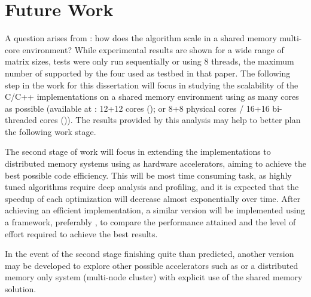 \section{Future Work}
A question arises from \cite{Deadman:Higham:Ralha:2012}: how does the algorithm scale in a shared memory multi-core environment? While experimental results are shown for a wide range of matrix sizes, tests were only run sequentially or using 8 threads, the maximum number of supported by the four \intel\xeon\cpus used as testbed in that paper. The following step in the work for this dissertation will focus in studying the scalability of the C/C++ implementations on a shared memory environment using as many cores as possible (available at \uminho: 12+12 cores (\amd); or 8+8 physical cores / 16+16 bi-threaded cores (\intel)). The results provided by this analysis may help to better plan the following work stage.

The second stage of work will focus in extending the implementations to distributed memory systems using \gpus as hardware accelerators, aiming to achieve the best possible code efficiency. This will be most time consuming task, as highly tuned algorithms require deep analysis and profiling, and it is expected that the speedup of each optimization will decrease almost exponentially over time. After achieving an efficient implementation, a similar version will be implemented using a framework, preferably \gama, to compare the performance attained and the level of effort required to achieve the best results.

In the event of the second stage finishing quite than predicted, another version may be developed to explore other possible accelerators such as \intel\mics or a distributed memory \cpu only system (multi-node cluster) with explicit use of the shared memory solution.
